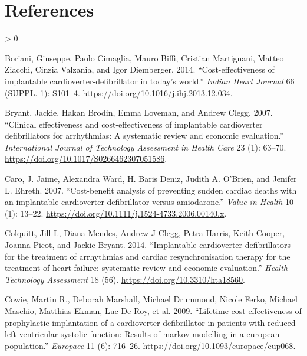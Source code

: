 \documentclass[
]{article}
\newlength{\cslhangindent}
\newenvironment{CSLReferences}[2] %
 {%
  \setlength{\parindent}{0pt}
  \ifodd #1 \everypar{\setlength{\hangindent}{\cslhangindent}}\ignorespaces\fi
  \ifnum #2 > 0
  \setlength{\parskip}{#2\baselineskip}
  \fi
 }%
 {}
\begin{document}
\hypertarget{references}{%
\section*{References}\label{references}}

\hypertarget{refs}{}
\begin{CSLReferences}{1}{0}
\leavevmode\hypertarget{ref-Boriani2014}{}%
Boriani, Giuseppe, Paolo Cimaglia, Mauro Biffi, Cristian Martignani, Matteo Ziacchi, Cinzia Valzania, and Igor Diemberger. 2014. {``{Cost-effectiveness of implantable cardioverter-defibrillator in today's world}.''} \emph{Indian Heart Journal} 66 (SUPPL. 1): S101--4. \url{https://doi.org/10.1016/j.ihj.2013.12.034}.

\leavevmode\hypertarget{ref-Bryant2007}{}%
Bryant, Jackie, Hakan Brodin, Emma Loveman, and Andrew Clegg. 2007. {``{Clinical effectiveness and cost-effectiveness of implantable cardioverter defibrillators for arrhythmias: A systematic review and economic evaluation}.''} \emph{International Journal of Technology Assessment in Health Care} 23 (1): 63--70. \url{https://doi.org/10.1017/S0266462307051586}.

\leavevmode\hypertarget{ref-Caro2007}{}%
Caro, J. Jaime, Alexandra Ward, H. Baris Deniz, Judith A. O'Brien, and Jenifer L. Ehreth. 2007. {``{Cost-benefit analysis of preventing sudden cardiac deaths with an implantable cardioverter defibrillator versus amiodarone}.''} \emph{Value in Health} 10 (1): 13--22. \url{https://doi.org/10.1111/j.1524-4733.2006.00140.x}.

\leavevmode\hypertarget{ref-Colquitt2014}{}%
Colquitt, Jill L, Diana Mendes, Andrew J Clegg, Petra Harris, Keith Cooper, Joanna Picot, and Jackie Bryant. 2014. {``{Implantable cardioverter defibrillators for the treatment of arrhythmias and cardiac resynchronisation therapy for the treatment of heart failure: systematic review and economic evaluation}.''} \emph{Health Technology Assessment} 18 (56). \url{https://doi.org/10.3310/hta18560}.

\leavevmode\hypertarget{ref-Cowie2009}{}%
Cowie, Martin R., Deborah Marshall, Michael Drummond, Nicole Ferko, Michael Maschio, Matthias Ekman, Luc De Roy, et al. 2009. {``{Lifetime cost-effectiveness of prophylactic implantation of a cardioverter defibrillator in patients with reduced left ventricular systolic function: Results of markov modelling in a european population}.''} \emph{Europace} 11 (6): 716--26. \url{https://doi.org/10.1093/europace/eup068}.


\end{CSLReferences}
\end{document}
